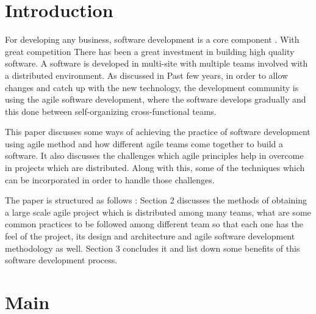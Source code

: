 \documentclass[sigconf]{acmart}
\begin{document}
\section{Introduction}
For developing any business, software development is a core component \cite{HenrikK}. With great competition There has been a great investment in building high quality software. A software is developed in multi-site with multiple teams involved with a distributed environment. As discussed in \cite{4638656}Past few years, in order to allow changes and catch up with the new technology, the development community is using the agile software development, where the software develops gradually and this done between self-organizing cross-functional teams\cite{Moe:2014:NLD:2652524.2652584}. 

This paper discusses some ways of achieving the practice of software development using agile method and how different agile teams come together to build a software\cite{SunitP}. It also discusses the challenges which agile principles help in overcome in projects which are distributed. Along with this, some of the techniques which can be incorporated in order to handle those challenges.

The paper is structured as follows : Section 2 discusses the methods of obtaining a large scale agile project which is distributed among many teams, what are some common practices to be followed among different team so that each one has the feel of the project, its design and architecture\cite{de2010conducting} and agile software development methodology as well. Section 3 concludes it and list down some benefits of this software development process.

\section{Main}
\end{document}
